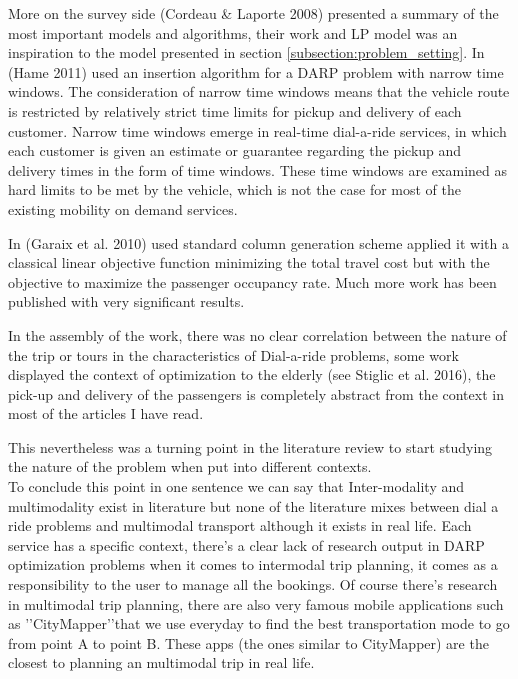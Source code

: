 \documentclass{article}
\begin{document}
More on the survey side (Cordeau \& Laporte 2008)\cite{2008_Cordeau_Laporte} presented a summary of the most important models and algorithms, their work and LP model was an inspiration to the model presented in section \ref{subsection:problem_setting}. In (Hame 2011)\cite{HAME2011} used an insertion algorithm for a DARP problem with narrow time windows. 
The consideration of narrow time windows means that the vehicle route is restricted by relatively strict time limits for pickup and delivery of each customer. Narrow time windows emerge in real-time dial-a-ride services, in which each customer is given an
estimate or guarantee regarding the pickup and delivery times in the form of time windows. 
These time windows are examined as hard limits to be met by the vehicle, which is not the case for most of the existing mobility on demand services.

In (Garaix et al. 2010) \cite{Garaix2010} used standard column generation scheme applied it with a classical linear objective function minimizing the total travel cost but with the objective to maximize the passenger occupancy rate. Much more work has been published with very significant results. 


In the assembly of the work, there was no clear correlation  between the nature of the trip or tours in the characteristics of Dial-a-ride problems, some work displayed the context of optimization to the elderly (see Stiglic et al. 2016)\citep{STIGLIC201812}, the pick-up and delivery of the passengers is completely abstract from the context in most of the articles I have read.

This nevertheless was a turning point in the literature review to start studying the nature of the problem when put into different contexts. \\

To conclude this point in one sentence we can say that Inter-modality and multimodality exist in literature but none of the literature mixes between dial a ride problems and multimodal transport although it exists in real life.
Each service has a specific context, there\rq{s} a clear lack of research output in DARP optimization problems when it comes to intermodal trip planning, it comes as a responsibility to the user to manage all the bookings. Of course there\rq{s} research in multimodal trip planning, there are also very famous mobile applications such as \rq\rq{CityMapper}\rq\rq that we use everyday to find the best transportation mode to go from point A to point B. These apps (the ones similar to CityMapper) are the closest to planning an multimodal trip in real life.
\end{document}
